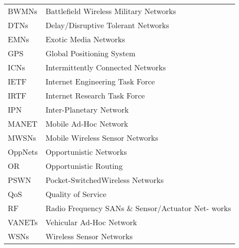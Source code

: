 %

\begin{tabular}{ll}
BWMNs & Battlefield Wireless Military Networks\\
DTNs & Delay/Disruptive Tolerant Networks\\
EMNs & Exotic Media Networks\\
GPS & Global Positioning System\\
ICNs & Intermittently Connected Networks\\
IETF & Internet Engineering Task Force\\
IRTF & Internet Research Task Force\\
IPN & Inter-Planetary Network\\
MANET & Mobile Ad-Hoc Network\\
MWSNs & Mobile Wireless Sensor Networks\\
OppNets & Opportunistic Networks\\
OR & Opportunistic Routing\\
PSWN & Pocket-SwitchedWireless Networks\\
QoS & Quality of Service\\
RF & Radio Frequency
SANs \& Sensor/Actuator Net- works\\
VANETs & Vehicular Ad-Hoc Network\\
WSNs & Wireless Sensor Networks\\
\end{tabular}

